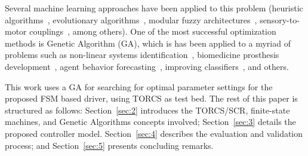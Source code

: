 Several machine learning approaches have been applied to this problem (heuristic algorithms~\cite{MrRacer}, evolutionary algorithms~\cite{Nallaperuma:2014}, modular fuzzy architectures~\cite{AUTOPIA}, sensory-to-motor couplings~\cite{COBOSTAR}, among others). One of the most successful optimization methods is Genetic Algorithm (GA), which is has been applied to a myriad of problems such as non-linear systems identification~\cite{GACTRL}, biomedicine prosthesis development~\cite{GABIO}, agent behavior forecasting~\cite{GAECO}, improving classifiers~\cite{pedrycz_genetic_2005}, and others.

This work uses a GA for searching for optimal parameter settings for the proposed FSM based driver, using TORCS as test bed. The rest of this paper is structured as follows: Section~\ref{sec:2} introduces the TORCS/SCR, finite-state machines, and Genetic Algorithms concepts involved; Section~\ref{sec:3} details the proposed controller model. Section~\ref{sec:4} describes the evaluation and validation process; and Section~\ref{sec:5} presents concluding remarks.